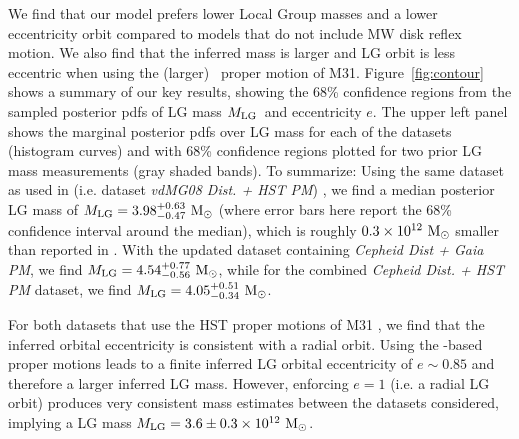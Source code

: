 \documentclass[twocolumn]{aastex631}
\newcommand{\mlg}{\ensuremath{M_{\rm LG}}}
\begin{document}
We find that our model prefers lower Local Group masses and a lower eccentricity
orbit compared to models that do not include MW disk reflex motion.
We also find that the inferred mass is larger and LG orbit is less eccentric
when using the (larger) \gaia\ proper motion of M31.
Figure~\ref{fig:contour} shows a summary of our key results, showing the 68\%
confidence regions from the sampled posterior pdfs of LG mass \mlg\ and
eccentricity $e$.
The upper left panel shows the marginal posterior pdfs over LG mass for each of
the datasets (histogram curves) and with 68\% confidence regions plotted for two
prior LG mass measurements (gray shaded bands).
To summarize: Using the same dataset as used in \citet{vdm2012}
(i.e. dataset \textit{vdMG08 Dist. + HST PM})
, we find a
median posterior LG mass of $\mlg = 3.98 ^{+0.63}_{-0.47}~\Msun$ (where error
bars here report the 68\% confidence interval around the median), which is
roughly $0.3\times 10^{12}~\mathrm{M}_\odot$ smaller than reported in \cite{vdm2012}. With
the updated dataset containing \textit{Cepheid Dist + Gaia PM}, we find
$\mlg = 4.54 ^{+0.77}_{-0.56}~\Msun$, while for the combined \textit{Cepheid
Dist. + HST PM} dataset, we find $\mlg = 4.05^{+0.51}_{-0.34}~\Msun$.

For both datasets that use the HST proper motions of M31 \citep{vdm2012}, we
find that the inferred orbital eccentricity is consistent with a radial orbit.
Using the \gaia-based proper motions \citep{Salomon2021} leads to a finite
inferred LG orbital eccentricity of $e\sim 0.85$ and therefore a larger inferred
LG mass.
However, enforcing $e=1$ (i.e. a radial LG orbit) produces very consistent mass
estimates between the datasets considered, implying a LG mass $\mlg = 3.6
\pm 0.3 \times 10^{12}~\Msun$.

\end{document}
